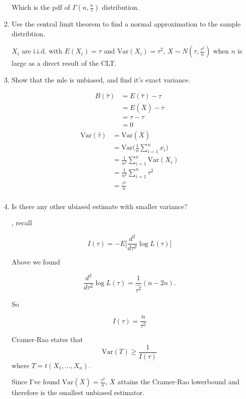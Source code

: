 \documentclass{tufte-book}
\newcommand{\Var}{\mathrm{Var}}
\theoremstyle{mytheoremstyle}
\theoremstyle{mylemstyle}
\theoremstyle{mydefstyle}
\begin{document}
\begin{enumerate}
Which is the pdf of $\Gamma(n, \frac{n}{\tau})$ distribution.

\item Use the central limit theorem to find a normal approximation to the sample distribtion.

 $X_i$ are i.i.d. with $E(X_i) = \tau$ and $\Var(X_i)=\tau^2$, $X \sim N(\tau, \frac{\tau^2}{n})$ when $n$ is large as a direct result of the CLT.

\item Show that the mle is unbiased, and find it's exact variance.

\begin{align*}
B(\hat{\tau}) &= E(\hat{\tau}) - \tau\\
&= E(\overline{X}) - \tau \\
&= \tau - \tau \\
&= 0
\end{align*}
\begin{align*}
\Var(\hat{\tau}) &= \Var(\overline{X})\\
&= \Var\Big( \frac{1}{n} \sum_{i=1}^n x_i \Big)\\
&= \frac{1}{n^2} \sum_{i=1}^n \Var(X_i) \\
&= \frac{1}{n^2} \sum_{i=1}^n \tau^2 \\
&= \frac{\tau^2}{n}\\
\end{align*}

\item Is there any other ubiased estimate with smaller variance?

, recall

\[ I(\tau) = -E\Big[ \frac{d^2}{d\tau^2} \log L(\tau)\Big] \]

Above we found

\[\frac{d^2}{d\tau^2} \log L(\tau) = \frac{1}{\hat{\tau^2}}(n-2n). \]

So

\[ I(\tau) = \frac{n}{\tau^2} \]

Cramer-Rao states that 
\[\Var(T) \geq \frac{1}{I(\tau)} \]
where $T=t(X_1,...,X_n)$.

Since I've found $\Var(\overline{X}) = \frac{\tau^2}{n}$, $\overline{X}$ attains the Cramer-Rao lowerbound and therefore is the smallest unbiased estimator.
\end{enumerate}
\end{document}
